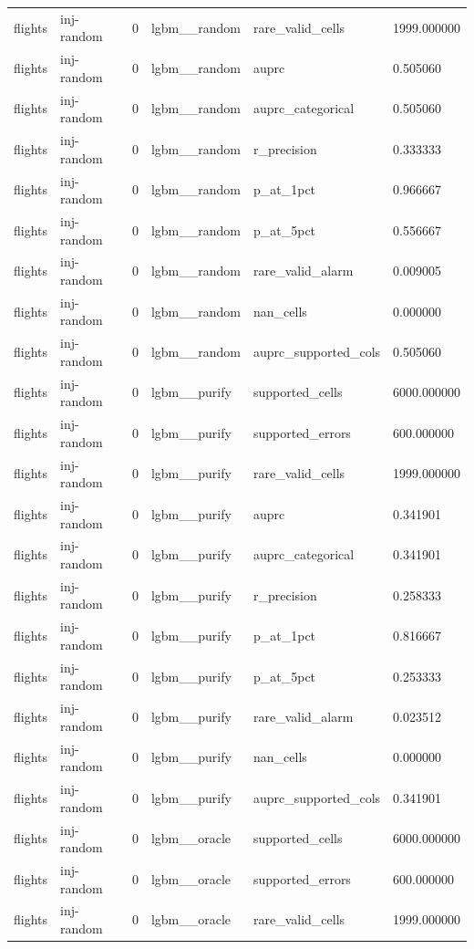 \begin{tabular}{llllll}
flights & inj-random & 0 & lgbm\_\_random & rare\_valid\_cells & 1999.000000 \\
flights & inj-random & 0 & lgbm\_\_random & auprc & 0.505060 \\
flights & inj-random & 0 & lgbm\_\_random & auprc\_categorical & 0.505060 \\
flights & inj-random & 0 & lgbm\_\_random & r\_precision & 0.333333 \\
flights & inj-random & 0 & lgbm\_\_random & p\_at\_1pct & 0.966667 \\
flights & inj-random & 0 & lgbm\_\_random & p\_at\_5pct & 0.556667 \\
flights & inj-random & 0 & lgbm\_\_random & rare\_valid\_alarm & 0.009005 \\
flights & inj-random & 0 & lgbm\_\_random & nan\_cells & 0.000000 \\
flights & inj-random & 0 & lgbm\_\_random & auprc\_supported\_cols & 0.505060 \\
flights & inj-random & 0 & lgbm\_\_purify & supported\_cells & 6000.000000 \\
flights & inj-random & 0 & lgbm\_\_purify & supported\_errors & 600.000000 \\
flights & inj-random & 0 & lgbm\_\_purify & rare\_valid\_cells & 1999.000000 \\
flights & inj-random & 0 & lgbm\_\_purify & auprc & 0.341901 \\
flights & inj-random & 0 & lgbm\_\_purify & auprc\_categorical & 0.341901 \\
flights & inj-random & 0 & lgbm\_\_purify & r\_precision & 0.258333 \\
flights & inj-random & 0 & lgbm\_\_purify & p\_at\_1pct & 0.816667 \\
flights & inj-random & 0 & lgbm\_\_purify & p\_at\_5pct & 0.253333 \\
flights & inj-random & 0 & lgbm\_\_purify & rare\_valid\_alarm & 0.023512 \\
flights & inj-random & 0 & lgbm\_\_purify & nan\_cells & 0.000000 \\
flights & inj-random & 0 & lgbm\_\_purify & auprc\_supported\_cols & 0.341901 \\
flights & inj-random & 0 & lgbm\_\_oracle & supported\_cells & 6000.000000 \\
flights & inj-random & 0 & lgbm\_\_oracle & supported\_errors & 600.000000 \\
flights & inj-random & 0 & lgbm\_\_oracle & rare\_valid\_cells & 1999.000000 \\

\end{tabular}
